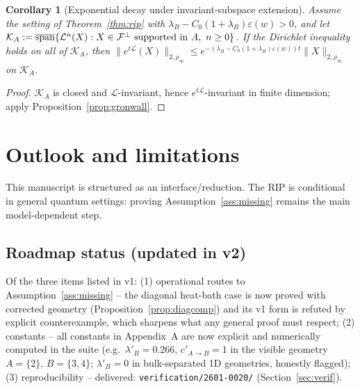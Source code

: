 \documentclass[11pt]{article}
\newtheorem{corollary}[theorem]{Corollary}
\theoremstyle{remark}
\begin{document}
\begin{corollary}[Exponential decay under invariant-subspace extension]
Assume the setting of Theorem~\ref{thm:rip} with $\lambda_B -
C_0(1+\lambda_B)\varepsilon(w) > 0$, and let $\mathcal{K}_A :=
\overline{\rm span}\{\mathcal{L}^n(X) : X \in \mathcal{F}^\perp
\text{ supported in } A,\ n \ge 0\}$. If the Dirichlet inequality holds on
all of $\mathcal{K}_A$, then $\|e^{t\mathcal{L}}(X)\|_{2,\rho_\infty} \le
e^{-(\lambda_B - C_0(1+\lambda_B)\varepsilon(w)) t}\|X\|_{2,\rho_\infty}$
on $\mathcal{K}_A$.
\end{corollary}
\begin{proof}
$\mathcal{K}_A$ is closed and $\mathcal{L}$-invariant, hence
$e^{t\mathcal{L}}$-invariant in finite dimension; apply
Proposition~\ref{prop:gronwall}.
\end{proof}

\section{Outlook and limitations}
This manuscript is structured as an interface/reduction. The RIP is
conditional in general quantum settings: proving
Assumption~\ref{ass:missing} remains the main model-dependent step.

\subsection{Roadmap status (updated in v2)}
Of the three items listed in v1: (1) operational routes to
Assumption~\ref{ass:missing} -- the diagonal heat-bath case is now proved
with corrected geometry (Proposition~\ref{prop:diagcomp}) and its v1 form
is refuted by explicit counterexample, which sharpens what any general
proof must respect; (2) constants -- all constants in Appendix~A are now explicit and
numerically computed in the suite (e.g.\ $\lambda'_B = 0.266$,
$c'_{A\to B} = 1$ in the visible geometry $A=\{2\}$, $B=\{3,4\}$;
$\lambda'_B = 0$ in bulk-separated 1D geometries, honestly flagged); (3) reproducibility --
delivered: \texttt{verification/2601-0020/} (Section~\ref{sec:verif}).
\end{document}
